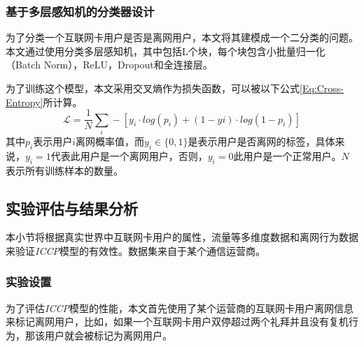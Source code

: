 \subsubsection{基于多层感知机的分类器设计}
为了分类一个互联网卡用户是否是离网用户，本文将其建模成一个二分类的问题。本文通过使用分类多层感知机，其中包括L个块，每个块包含小批量归一化（Batch Norm），ReLU，Dropout和全连接层。\par
为了训练这个模型，本文采用交叉熵作为损失函数，可以被以下公式\eqref{Eq:Cross-Entropy}所计算。
\begin{equation}
	\mathcal{L} = \frac{1}{N} \sum_{i}^{} -[y_{i} \cdot log(p_{i}) + (1-y{i}) \cdot log(1-p_{i})]
	\label{Eq:Cross-Entropy}
\end{equation}
其中$p_{i}$表示用户$i$离网概率值，而$y_{i} \in \{ 0, 1\}$是表示用户是否离网的标签，具体来说，$y_{i} = 1$代表此用户是一个离网用户，否则，$y_{i} = 0$此用户是一个正常用户。$N$表示所有训练样本的数量。


\subsection{实验评估与结果分析}
本小节将根据真实世界中互联网卡用户的属性，流量等多维度数据和离网行为数据来验证\emph{ICCP}模型的有效性。数据集来自于某个通信运营商。

\subsubsection{实验设置}
为了评估\emph{ICCP}模型的性能，本文首先使用了某个运营商的互联网卡用户离网信息来标记离网用户，比如，如果一个互联网卡用户双停超过两个礼拜并且没有复机行为，那该用户就会被标记为离网用户。\par

